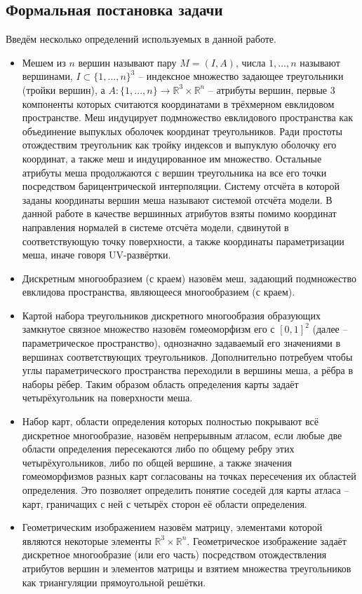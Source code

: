 \subsection{Формальная постановка задачи}
Введём несколько определений используемых в данной работе.
\begin{itemize}
\item Мешем из $n$ вершин называют пару $M = (I, A)$, числа $1,...,n$ называют вершинами, $I \subset \{1, ..., n\}^3$ -- индексное множество задающее треугольники (тройки вершин), а $A: \{1, ..., n\} \rightarrow \mathbb{R}^3 \times \mathbb{R}^n$ -- атрибуты вершин, первые 3 компоненты которых считаются координатами в трёхмерном евклидовом пространстве. Меш индуцирует подмножество евклидового пространства как объединение выпуклых оболочек координат треугольников. Ради простоты отождествим треугольник как тройку индексов и выпуклую оболочку его координат, а также меш и индуцированное им множество. Остальные атрибуты меша продолжаются с вершин треугольника на все его точки посредством барицентрической интерполяции. Систему отсчёта в которой заданы координаты вершин меша называют системой отсчёта модели. В данной работе в качестве вершинных атрибутов взяты помимо координат направления нормалей в системе отсчёта модели, сдвинутой в соответствующую точку поверхности, а также координаты параметризации меша, иначе говоря UV-развёртки.
\item Дискретным многообразием (с краем) назовём меш, задающий подмножество евклидова пространства, являющееся многообразием (с краем).
\item Картой набора треугольников дискретного многообразия образующих замкнутое связное множество назовём гомеоморфизм его с $[0,1]^2$ (далее -- параметрическое пространство), однозначно задаваемый его значениями в вершинах соответствующих треугольников. Дополнительно потребуем чтобы углы параметрического пространства переходили в вершины меша, а рёбра в наборы рёбер. Таким образом область определения карты задаёт четырёхугольник на поверхности меша.
\item Набор карт, области определения которых полностью покрывают всё дискретное многообразие, назовём непрерывным атласом, если любые две области определения пересекаются либо по общему ребру этих четырёхугольников, либо по общей вершине, а также значения гомеоморфизмов разных карт согласованы на точках пересечения их областей определения. Это позволяет определить понятие соседей для карты атласа -- карт, граничащих с ней с четырёх сторон её области определения.
\item Геометрическим изображением назовём матрицу, элементами которой являются некоторые элементы $\mathbb{R}^3\times \mathbb{R}^n$. Геометрическое изображение задаёт дискретное многообразие (или его часть) посредством отождествления атрибутов вершин и элементов матрицы и взятием множества треугольников как триангуляции прямоугольной решётки.

\end{itemize}
